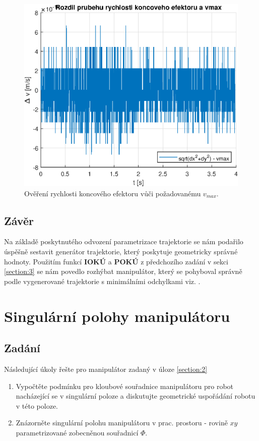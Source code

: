 \documentclass{article}
\begin{document}
				\begin{figure}[H]
					\centering
					\includegraphics[width=\textwidth]{./Graphics/4_Graphics/vmax_overeni.eps}
					\caption{Ověření rychlosti koncového efektoru vůči požadovanému \(v_{max}\).}
					\label{graph:4_vmax_overeni}
				\end{figure}
		\subsection{Závěr}
			Na základě poskytnutého odvození parametrizace trajektorie se nám podařilo úspěšně sestavit generátor trajektorie, který poskytuje geometricky správné hodnoty. Použitím funkcí \textbf{IOKÚ} a \textbf{POKÚ} z předchozího zadání v sekci \ref{section:3} se nám povedlo rozhýbat manipulátor, který se pohyboval správně podle vygenerované trajektorie s minimálními odchylkami viz. .
	\newpage	
	\section{Singulární polohy manipulátoru}
		\subsection{Zadání}
			Následující úkoly řešte pro manipulátor zadaný v úloze \ref{section:2}
				\begin{enumerate}
					\item Vypočtěte podmínku pro kloubové souřadnice manipulátoru pro robot nacházející se v singulární poloze a diskutujte geometrické uspořádání robotu v této poloze.
					\item Znázorněte singulární polohu manipulátoru v prac. prostoru - rovině \(xy\) parametrizované zobecněnou souřadnicí \(\Phi\).
				\end{enumerate}
\end{document}
